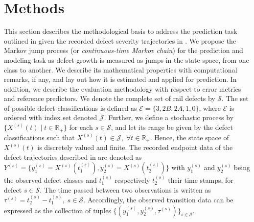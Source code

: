 

\section{Methods} \label{sec:methods}
This section describes the methodological basis to address the prediction task outlined in  given the recorded defect severity trajectories in . 
We propose the Markov jump process (or \textit{continuous-time Markov chain}) for the prediction and modeling task as defect growth is measured as jumps in the state space, from one class to another.
We describe its mathematical properties with computational remarks, if any, and lay out how it is estimated and applied for prediction. In addition, we describe the evaluation methodology with respect to error metrics and reference predictors. 
We denote the complete set of rail defects by $\mathcal{S}$. The set of possible defect classifications is defined as $\mathcal{E} = \{3, 2B, 2A, 1, 0\}$, where $\mathcal{E}$ is ordered with index set denoted $\mathcal{J}$.
Further, we define a stochastic process by $\{ X^{(s)}(t) \; \vert \; t \in \mathbb R_+\}$ for each $s \in \mathcal{S}$, and let its range be given by the defect classifications such that $ X^{(s)}(t) \in \mathcal{J}, \; \forall t \in \mathbb R_+$. Hence, the state space of $X^{(s)}(t)$ is discretely valued and finite. 
The recorded endpoint data of the defect trajectories described in  are denoted as $Y^{(s)} = \{ y_1^{(s)} = X^{(s)}(t_1^{(s)}), y_2^{(s)} = X^{(s)}(t_2^{(s)}) \}$ with $y_1^{(s)}$ and $y_2^{(s)}$ being the observed defect classes and $t_1^{(s)}$ respectively $t_2^{(s)}$ their time stamps, for defect $s \in \mathcal{S}$. The time passed between two observations is written as $\tau^{(s)} = t_2^{(s)} - t_1^{(s)}, \; s \in \mathcal{S}$. Accordingly, the observed transition data can be expressed as the collection of tuples $\{ ( y_1^{(s)}, y_2^{(s)}, \tau^{(s)} ) \}_{s \in \mathcal{S}}$. 




